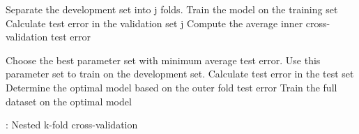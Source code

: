 \linespacesmall
\begin{algorithm}[htb]\footnotesize
\begin{algorithmic}[1]
\parbox{15.0cm}
{
        \STATE Separate the development set into j folds.
                \STATE Train the model on the training set
                \STATE Calculate test error in the validation set j
        \ENDFOR
        \STATE Compute the average inner cross-validation test error
    \ENDFOR

    \STATE Choose the best parameter set with minimum average test error.
    \STATE Use this parameter set to train on the development set.
    \STATE Calculate test error in the test set
\ENDFOR
\STATE Determine the optimal model based on the outer fold test error
\STATE Train the full dataset on the optimal model
}
\end{algorithmic}
\caption{: Nested k-fold cross-validation}
\label{algorithm:1}
\end{algorithm}
\linespacenormal



